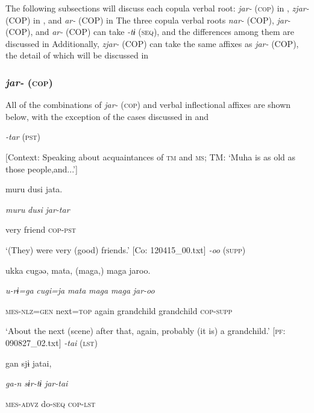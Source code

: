 The following subsections will discuss each copula verbal root: \textit{jar-} (\textsc{cop}) in , \textit{zjar-} (COP) in , and \textit{ar-} (COP) in  The three copula verbal roots \textit{nar-} (COP), \textit{jar-} (COP), and \textit{ar-} (COP) can take \textit{{}-tɨ} (\textsc{seq}), and the differences among them are discussed in  Additionally, \textit{zjar-} (COP) can take the same affixes as \textit{jar-} (COP), the detail of which will be discussed in 

\subsubsection{\textit{jar-} (\textsc{cop})}

All of the combinations of \textit{jar-} (\textsc{cop}) and verbal inflectional affixes are shown below, with the exception of the cases discussed in  and 

\textbf{\ea\label{ex:8-36}
}\ea \textit{{}-tar} (\textsc{pst})

    [Context: Speaking about acquaintances of \textsc{tm} and \textsc{ms}; TM: ‘Muha is as old as those people,and...’]

    {\TM}
\glll  muru  dusi  jata.

      \textit{muru}  \textit{dusi}  \textit{jar-tar}

      very  friend  \textsc{cop}-\textsc{pst}

\glt ‘(They) were very (good) friends.’ [Co: 120415\_00.txt]
\ex \textit{{}-oo} (\textsc{supp})

    {\TM}
\glll  ukka  cugəə,  mata,  (maga,)  maga  jaroo.

      \textit{u-rɨ=ga}  \textit{cugi=ja}  \textit{mata}  \textit{maga}  \textit{maga}  \textit{jar-oo}

      \textsc{mes}-\textsc{nlz}=\textsc{gen}  next=\textsc{top}  again  grandchild  grandchild  \textsc{cop}-\textsc{supp}

\glt ‘About the next (scene) after that, again, probably (it is) a grandchild.’ [\textsc{pf}: 090827\_02.txt]
\ex \textit{{}-tai} (\textsc{lst})

    {\TM}
\glll  gan  sjɨ  jatai,

      \textit{ga-n}  \textit{sɨr-tɨ}  \textit{jar-tai}

      \textsc{mes}-\textsc{advz}  do-\textsc{seq}  \textsc{cop}-\textsc{lst}

